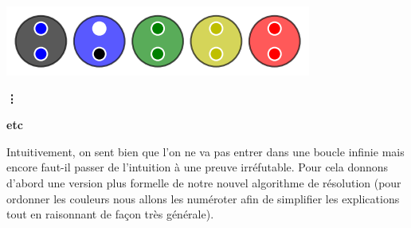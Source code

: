 \begin{multicols}{2}
\begin{center}
		\includegraphics[scale= 0.45]{content/algo_bubble/example/014.png}
		
		\textbf{\vdots}

		\textbf{etc}
	\end{center}
\end{multicols}


Intuitivement, on sent bien que l'on ne va pas entrer dans une boucle infinie mais encore faut-il passer de l'intuition à une preuve irréfutable. Pour cela donnons d'abord une version plus formelle de notre nouvel algorithme de résolution (pour ordonner les couleurs nous allons les numéroter afin de simplifier les explications tout en raisonnant de façon très générale).

\bigskip

